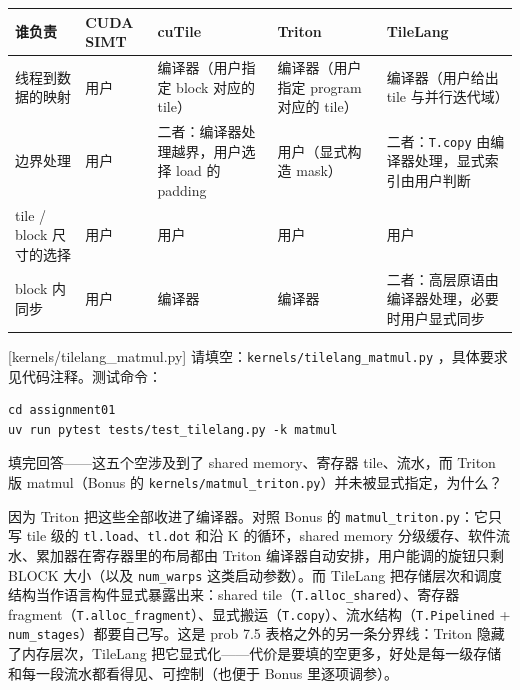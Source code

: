\documentclass[11pt,a4paper,fontset=none]{ctexart}
\begin{document}
\begin{center}\small
  \begin{tabularx}{\linewidth}{@{}p{7.5em}
    >{\raggedright\arraybackslash}X
    >{\raggedright\arraybackslash}X
    >{\raggedright\arraybackslash}X
    >{\raggedright\arraybackslash}X@{}}
    \toprule
    谁负责 & CUDA SIMT                           & cuTile & Triton & TileLang \\
    \midrule
    线程到数据的映射
        & 用户
        & 编译器（用户指定 block 对应的 tile）
        & 编译器（用户指定 program 对应的 tile）
        & 编译器（用户给出 tile 与并行迭代域）                                            \\
    边界处理
        & 用户
        & 二者：编译器处理越界，用户选择 load 的 padding
        & 用户（显式构造 mask）
        & 二者：\texttt{T.copy} 由编译器处理，显式索引由用户判断                              \\
    tile / block 尺寸的选择
        & 用户
        & 用户
        & 用户
        & 用户                                                               \\
    block 内同步
        & 用户
        & 编译器
        & 编译器
        & 二者：高层原语由编译器处理，必要时用户显式同步                                          \\
    \bottomrule
  \end{tabularx}
\end{center}

[kernels/tilelang\_matmul.py]
请填空：\texttt{kernels/tilelang\_matmul.py} ，具体要求见代码注释。测试命令：

\begin{lstlisting}
cd assignment01
uv run pytest tests/test_tilelang.py -k matmul
\end{lstlisting}

填完回答——这五个空涉及到了 shared memory、寄存器 tile、流水，而 Triton 版 matmul（Bonus 的 \texttt{kernels/matmul\_triton.py}）并未被显式指定，为什么？

因为 Triton 把这些全部收进了编译器。对照 Bonus 的 \texttt{matmul\_triton.py}：它只写 tile 级的 \texttt{tl.load}、\texttt{tl.dot} 和沿 K 的循环，shared memory 分级缓存、软件流水、累加器在寄存器里的布局都由 Triton 编译器自动安排，用户能调的旋钮只剩 BLOCK 大小（以及 \texttt{num\_warps} 这类启动参数）。而 TileLang 把存储层次和调度结构当作语言构件显式暴露出来：shared tile（\texttt{T.alloc\_shared}）、寄存器 fragment（\texttt{T.alloc\_fragment}）、显式搬运（\texttt{T.copy}）、流水结构（\texttt{T.Pipelined} + \texttt{num\_stages}）都要自己写。这是 prob 7.5 表格之外的另一条分界线：Triton 隐藏了内存层次，TileLang 把它显式化——代价是要填的空更多，好处是每一级存储和每一段流水都看得见、可控制（也便于 Bonus 里逐项调参）。
\end{document}
